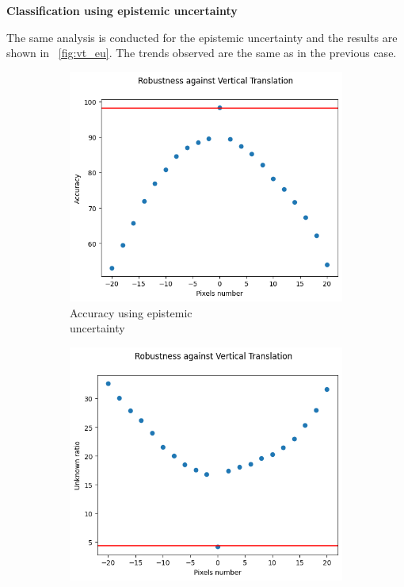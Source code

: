 \vspace{0.3cm}
\textbf{Classification using epistemic uncertainty}
\vspace{0.1cm}

The same analysis is conducted for the epistemic uncertainty and the results are shown in \Fig~\ref{fig:vt_eu}. The trends observed are the same as in the previous case.

\begin{figure}[h]
	\centering
	\begin{subfigure}{.33\textwidth}
		\centering
		\includegraphics[width=0.9\linewidth]{ImageFiles/EvalBNN/VT/EU/acc}
		\caption{Accuracy using epistemic \\ uncertainty}
		\label{fig:vt_eu_acc}
	\end{subfigure}%
	\begin{subfigure}{.33\textwidth}
		\centering
		\includegraphics[width=0.9\linewidth]{ImageFiles/EvalBNN/VT/EU/unkn}

\end{subfigure}
\end{figure}
